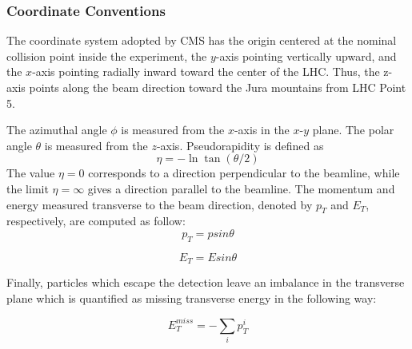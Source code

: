 
\subsubsection{Coordinate Conventions}
The coordinate system adopted by CMS has the origin centered at the nominal collision point inside the experiment,  the $y$-axis pointing vertically upward, and the $x$-axis pointing radially inward toward the center of the LHC. Thus, the z-axis points along the beam direction toward the Jura mountains from LHC Point 5. 

The azimuthal angle $\phi$ is measured from the $x$-axis in the $x$-$y$ plane. The polar angle $\theta$ is measured from the $z$-axis. Pseudorapidity is defined as 
\begin{equation}
\eta = -\ln \tan (\theta / 2)
\end{equation}
The value $\eta=0$ corresponds to a direction perpendicular to the beamline, while the limit $\eta = \infty$ gives a direction parallel to the beamline. The momentum and energy measured transverse to the beam direction, denoted by $p_T$ and $E_T$, respectively, are computed  as follow:
\begin{equation}
p_T = p sin \theta
\end{equation}

\begin{equation}
E_T = E sin \theta
\end{equation}

Finally, particles which escape the detection leave an imbalance in the transverse plane which is quantified as missing transverse energy in the following way:

\begin{equation}
E_T^{miss} = - \sum_i p_T^i
\end{equation}

